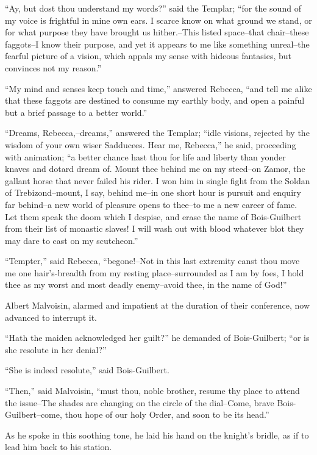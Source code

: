 ``Ay, but dost thou understand my words?'' said the Templar; ``for the
sound of my voice is frightful in mine own ears. I scarce know on what
ground we stand, or for what purpose they have brought us hither.--This
listed space--that chair--these faggots--I know their purpose, and yet
it appears to me like something unreal--the fearful picture of a vision,
which appals my sense with hideous fantasies, but convinces not my
reason.''

``My mind and senses keep touch and time,'' answered Rebecca, ``and tell
me alike that these faggots are destined to consume my earthly body, and
open a painful but a brief passage to a better world.''

``Dreams, Rebecca,--dreams,'' answered the Templar; ``idle visions,
rejected by the wisdom of your own wiser Sadducees. Hear me, Rebecca,''
he said, proceeding with animation; ``a better chance hast thou for life
and liberty than yonder knaves and dotard dream of. Mount thee behind me
on my steed--on Zamor, the gallant horse that never failed his rider. I
won him in single fight from the Soldan of Trebizond--mount, I say,
behind me--in one short hour is pursuit and enquiry far behind--a new
world of pleasure opens to thee--to me a new career of fame. Let them
speak the doom which I despise, and erase the name of Bois-Guilbert from
their list of monastic slaves! I will wash out with blood whatever blot
they may dare to cast on my scutcheon.''

``Tempter,'' said Rebecca, ``begone!--Not in this last extremity canst
thou move me one hair's-breadth from my resting place--surrounded as I
am by foes, I hold thee as my worst and most deadly enemy--avoid thee,
in the name of God!''

Albert Malvoisin, alarmed and impatient at the duration of their
conference, now advanced to interrupt it.

``Hath the maiden acknowledged her guilt?'' he demanded of
Bois-Guilbert; ``or is she resolute in her denial?''

``She is indeed resolute,'' said Bois-Guilbert.

``Then,'' said Malvoisin, ``must thou, noble brother, resume thy place
to attend the issue--The shades are changing on the circle of the
dial--Come, brave Bois-Guilbert--come, thou hope of our holy Order, and
soon to be its head.''

As he spoke in this soothing tone, he laid his hand on the knight's
bridle, as if to lead him back to his station.

